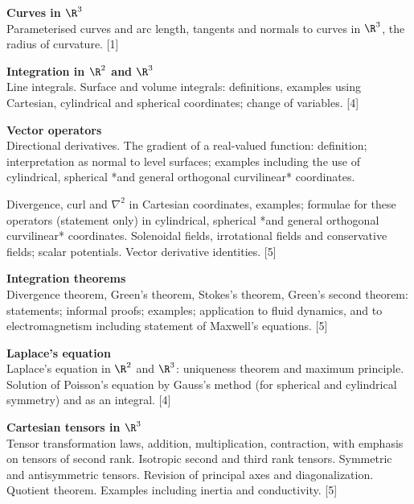 \documentclass[a4paper]{article}
\begin{document}
\maketitle
{\small
  \noindent\textbf{Curves in $\R^3$}\\
  Parameterised curves and arc length, tangents and normals to curves in $\R^3$, the radius of curvature.\hspace*{\fill} [1]

  \vspace{10pt}
  \noindent\textbf{Integration in $\R^2$ and $\R^3$}\\
  Line integrals. Surface and volume integrals: definitions, examples using Cartesian, cylindrical and spherical coordinates; change of variables.\hspace*{\fill} [4]

  \vspace{10pt}
  \noindent\textbf{Vector operators}\\
  Directional derivatives. The gradient of a real-valued function: definition; interpretation as normal to level surfaces; examples including the use of cylindrical, spherical *and general orthogonal curvilinear* coordinates.

  \vspace{5pt}
  \noindent Divergence, curl and $\nabla^2$ in Cartesian coordinates, examples; formulae for these operators (statement only) in cylindrical, spherical *and general orthogonal curvilinear* coordinates. Solenoidal fields, irrotational fields and conservative fields; scalar potentials. Vector derivative identities.\hspace*{\fill} [5]

  \vspace{10pt}
  \noindent\textbf{Integration theorems}\\
  Divergence theorem, Green's theorem, Stokes's theorem, Green's second theorem: statements; informal proofs; examples; application to fluid dynamics, and to electromagnetism including statement of Maxwell's equations.\hspace*{\fill} [5]

  \vspace{10pt}
  \noindent\textbf{Laplace's equation}\\
  Laplace's equation in $\R^2$ and $\R^3$: uniqueness theorem and maximum principle. Solution of Poisson's equation by Gauss's method (for spherical and cylindrical symmetry) and as an integral.\hspace*{\fill} [4]

  \vspace{10pt}
  \noindent\textbf{Cartesian tensors in $\R^3$}\\
  Tensor transformation laws, addition, multiplication, contraction, with emphasis on tensors of second rank. Isotropic second and third rank tensors. Symmetric and antisymmetric tensors. Revision of principal axes and diagonalization. Quotient theorem. Examples including inertia and conductivity.\hspace*{\fill} [5]}
\end{document}
